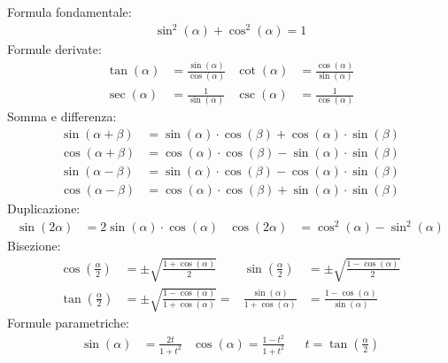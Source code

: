 \documentclass[a4paper]{article}
\begin{document}
	Formula fondamentale:
	\begin{align*}
	\sin ^2 (\alpha) + \cos^2 (\alpha) = 1
	\end{align*}
	Formule derivate:
	\begin{align*}
	\tan (\alpha) & = \frac{\sin (\alpha)}{\cos (\alpha)} & \cot (\alpha) & = \frac{\cos (\alpha)}{\sin (\alpha)} \\
	\sec (\alpha) & = \frac{1}{\sin (\alpha)}             & \csc (\alpha) & = \frac{1}{\cos (\alpha)}
	\end{align*}
	Somma e differenza:
	\begin{align*}
	\sin (\alpha + \beta) & = \sin (\alpha) \cdot \cos (\beta) + \cos (\alpha) \cdot \sin (\beta)\\
	\cos (\alpha + \beta) & = \cos (\alpha) \cdot \cos (\beta) - \sin (\alpha) \cdot \sin (\beta)\\
	\sin (\alpha - \beta) & = \sin (\alpha) \cdot \cos (\beta) - \cos (\alpha) \cdot \sin (\beta)\\
	\cos (\alpha - \beta) & = \cos (\alpha) \cdot \cos (\beta) + \sin (\alpha) \cdot \sin (\beta)
	\end{align*}
	Duplicazione:
	\begin{align*}
	\sin (2 \alpha) & = 2 \sin (\alpha) \cdot \cos (\alpha)	&	\cos (2 \alpha) & = \cos^2 (\alpha) - \sin^2 (\alpha)
	\end{align*}
	Bisezione:
	\begin{align*}
	\cos \left(\frac{\alpha}{2}\right) &= \pm \sqrt{\frac{1 + \cos (\alpha)}{2}} & \sin \left(\frac{\alpha}{2}\right) &= \pm \sqrt{\frac{1 - \cos (\alpha)}{2}}\\
	\tan \left(\frac{\alpha}{2}\right) &= \pm \sqrt{\frac{1-\cos (\alpha)}{1+\cos (\alpha)}} = &\frac{\sin (\alpha)}{1+\cos (\alpha)} &= \frac{1-\cos (\alpha)}{\sin (\alpha)}
	\end{align*}
	Formule parametriche:
	\begin{align*}
	\sin (\alpha) &= \frac{2t}{1+t^2} & \cos (\alpha) = \frac{1 - t^2}{1 + t^2} & & t= \tan \left(\frac{\alpha}{2}\right)
	\end{align*}
	
	\begin{center}
	\end{center}
	
\end{document}
